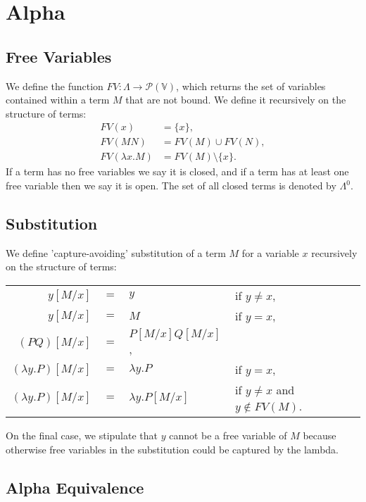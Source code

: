 \section{Alpha}

\subsection{Free Variables}

We define the function $FV : \Lambda \to \mathcal{P}(\mathbb{V})$,
which returns the set of variables contained within a term $M$ that
are not bound. We define it recursively on the structure of terms: 
\begin{align*}
    FV(x) &= \{x\}, \\
    FV(MN) &= FV(M) \cup FV(N), \\
    FV(\lambda x.M) &= FV(M) \setminus \{x\}.
\end{align*} If a term has no free variables we say it is closed,
and if a term has at least one free variable then we say it is open.
The set of all closed terms is denoted by $\Lambda^0$.

\subsection{Substitution}

We define 'capture-avoiding' substitution of a term $M$ for a variable $x$
recursively on the structure of terms: \begin{center}
    \begin{tabular}{ r c l l }
        $y[M/x]$             & $=$ & $y$                        & if $y \neq x$, \\
        $y[M/x]$             & $=$ & $M$                        & if $y = x$, \\
        $(PQ)[M/x]$          & $=$ & $P[M/x] Q[M/x]$, & \\
        $(\lambda y.P)[M/x]$ & $=$ & $\lambda y.P$              & if $y = x$, \\
        $(\lambda y.P)[M/x]$ & $=$ & $\lambda y.P[M/x]$         & if $y \neq x$ and $y \notin FV(M)$.
    \end{tabular} 
\end{center} On the final case, we stipulate that $y$ cannot be a free variable of
$M$ because otherwise free variables in the substitution could be captured by
the lambda.

\subsection{Alpha Equivalence}


